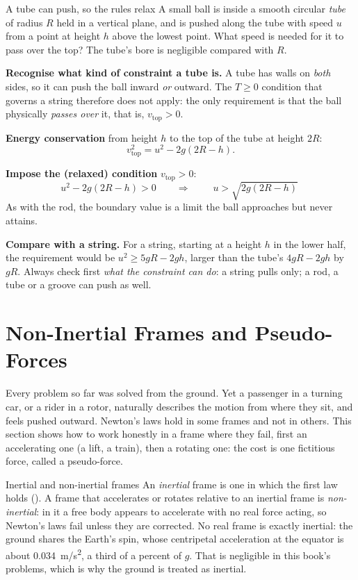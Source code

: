 \begin{exbox}{A tube can push, so the rules relax}
A small ball is inside a smooth circular \emph{tube} of radius $R$ held in a vertical plane, and is
pushed along the tube with speed $u$ from a point at height $h$ above the lowest point. What speed is
needed for it to pass over the top? The tube's bore is negligible compared with $R$.

 \textbf{Recognise what kind of constraint a tube is.} A tube has walls on \emph{both} sides,
so it can push the ball inward \emph{or} outward. The $T\ge0$ condition that governs a string therefore
does not apply: the only requirement is that the ball physically \emph{passes over} it, that is,
$v_{\text{top}}>0$.

 \textbf{Energy conservation} from height $h$ to the top of the tube at height $2R$:
\[
v_{\text{top}}^{2}=u^{2}-2g(2R-h).
\]

 \textbf{Impose the (relaxed) condition} $v_{\text{top}}>0$:
\[
u^{2}-2g(2R-h)>0
\qquad\Longrightarrow\qquad
\boxed{\;u>\sqrt{2g(2R-h)}\;}
\]
As with the rod, the boundary value is a limit the ball approaches but never attains.

\smallskip
\textbf{Compare with a string.} For a string, starting at a height $h$ in the lower half, the
requirement would be $u^{2}\ge5gR-2gh$, larger than the tube's $4gR-2gh$ by $gR$. Always check first
\emph{what the constraint can do}: a string pulls only; a rod, a tube or a groove can push as well.
\end{exbox}

\section{Non-Inertial Frames and Pseudo-Forces}\label{sec:noninertial}

Every problem so far was solved from the ground. Yet a passenger in a turning car, or a rider in a
rotor, naturally describes the motion from where they sit, and feels pushed outward. Newton's laws
hold in some frames and not in others. This section shows how to work honestly in a frame where they
fail, first an accelerating one (a lift, a train), then a rotating one: the cost is one fictitious
force, called a pseudo-force.

\begin{defbox}{Inertial and non-inertial frames}
An \emph{inertial} frame is one in which the first law holds (). A frame that
accelerates or rotates relative to an inertial frame is \emph{non-inertial}: in it a free body appears
to accelerate with no real force acting, so Newton's laws fail unless they are corrected.
No real frame is exactly inertial: the ground shares the Earth's spin, whose centripetal acceleration
at the equator is about \SI{0.034}{m/s^2}, a third of a percent of $g$. That is negligible in this
book's problems, which is why the ground is treated as inertial.
\end{defbox}

